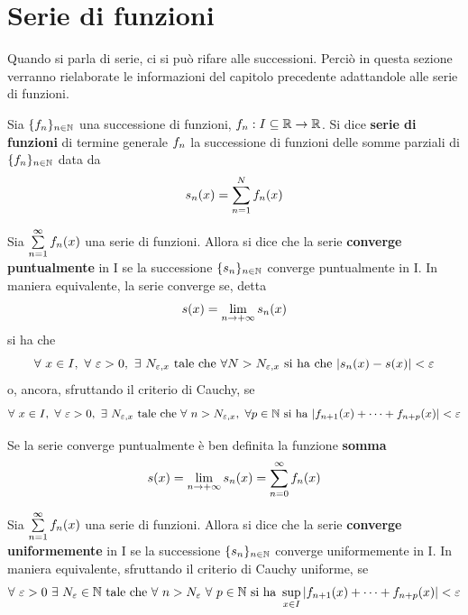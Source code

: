 \section{Serie di funzioni}
Quando si parla di serie, ci si può rifare alle successioni. Perciò in questa sezione verranno rielaborate le informazioni del capitolo precedente adattandole alle serie di funzioni.
\begin{definition}
    Sia $\{f_n\}_{n \in \mathbb{N}}$ una successione di funzioni, $f_n: I \subseteq \mathbb{R} \to \mathbb{R}$. Si dice \textbf{serie di funzioni} di termine generale $f_n$ la successione di funzioni delle somme parziali di $\{f_n\}_{n \in \mathbb{N}}$ data da
    \begin{equation*}
        s_n(x)=\sum\limits_{n=1}^{N}{f_n(x)}
    \end{equation*}
\end{definition}
\begin{definition}
    Sia $\sum\limits_{n=1}^{\infty}{f_n(x)}$ una serie di funzioni. Allora si dice che la serie \textbf{converge puntualmente} in I se la successione $\{s_n\}_{n \in \mathbb{N}}$ converge puntualmente in I. In maniera equivalente, la serie converge se, detta
    \begin{equation*}
        s(x)=\lim_{n \to +\infty}{s_n(x)}
    \end{equation*}
    si ha che
    \begin{equation*}
        \forall\ x \in I,\ \forall\ \varepsilon>0,\ \exists\ N_{\varepsilon, x}\ \text{tale che}\ \forall N>N_{\varepsilon, x}\ \text{si ha che}\ |\sn(x)-s(x)|< \varepsilon
    \end{equation*}
    o, ancora, sfruttando il criterio di Cauchy, se
    \begin{equation*}
        \forall\ x \in I,\ \forall\ \varepsilon>0,\ \exists\ N_{\varepsilon, x}\ \text{tale che}\ \forall\ n>N_{\varepsilon, x},\ \forall p \in \N\ \text{si ha}\ |f_{n+1}(x)+ \dots+ f_{n+p}(x)|<\varepsilon
    \end{equation*}
\end{definition}
\begin{definition}
    Se la serie converge puntualmente è ben definita la funzione \textbf{somma}
    \begin{equation*}
        s(x)=\lim_{n \to +\infty}{s_n(x)}= \sum_{n=0}^{\infty}{f_n(x)}
    \end{equation*}
\end{definition}
\begin{definition}
Sia $\sum\limits_{n=1}^{\infty}{f_n(x)}$ una serie di funzioni. Allora si dice che la serie \textbf{converge uniformemente} in I se la successione $\{s_n\}_{n \in \mathbb{N}}$ converge uniformemente in I. In maniera equivalente, sfruttando il criterio di Cauchy uniforme, se
\begin{equation*}
\forall\ \varepsilon>0\ \exists\ N_\varepsilon \in \N\ \text{tale che}\ \forall\ n > N_\varepsilon\ \forall\ p \in \N\ \text{si ha}\ \sup_{x \in I}{|f_{n+1}(x)+\dots+f_{n+p}(x)|}<\varepsilon 
\end{equation*}
\end{definition}
